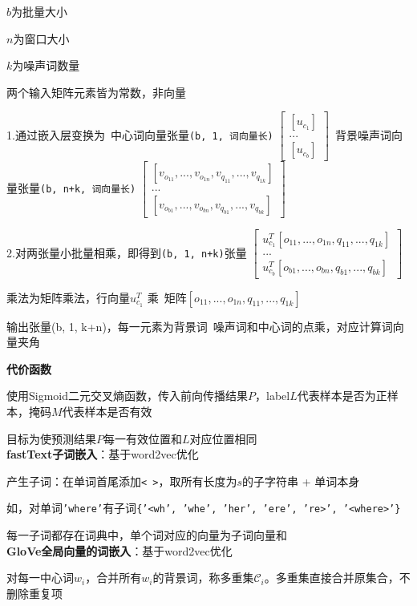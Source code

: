 \documentclass[UTF8]{ctexart}
\begin{document}
  \quad \quad $b$为批量大小

  \quad \quad $n$为窗口大小

  \quad \quad $k$为噪声词数量

  \quad \quad 两个输入矩阵元素皆为常数，非向量

  \quad 1.通过嵌入层变换为\ 中心词向量张量\texttt{(b, 1, 词向量长)}
  $\begin{bmatrix}
    [u_{c_1}] \\
    ... \\
    [u_{c_b}]
    \end{bmatrix}
  $\ 背景噪声词向量张量\texttt{(b, n+k, 词向量长)}
  $\begin{bmatrix}
    [v_{o_{11}}, ..., v_{o_{1n}}, v_{q_{11}}, ..., v_{q_{1k}}] \\
    ... \\
    [v_{o_{b1}}, ..., v_{o_{bn}}, v_{q_{b1}}, ..., v_{q_{bk}}]
    \end{bmatrix}
  $

  \quad 2.对两张量小批量相乘，即得到\texttt{(b, 1, n+k)}张量
  $\begin{bmatrix}
    u_{c_1}^T [o_{11}, ..., o_{1n}, q_{11}, ..., q_{1k}] \\
    ... \\
    u_{c_b}^T [o_{b1}, ..., o_{bn}, q_{b1}, ..., q_{bk}]
    \end{bmatrix}
  $

  \quad 乘法为矩阵乘法，行向量$u_{c_1}^T$ 乘\ 矩阵$[o_{11}, ..., o_{1n}, q_{11}, ..., q_{1k}]$
  
  \quad 输出张量(b, 1, k+n)，每一元素为背景词\ 噪声词和中心词的点乘，对应计算词向量夹角
  
  \textbf{代价函数}

  \quad 使用Sigmoid二元交叉熵函数，传入前向传播结果$P$，label$L$代表样本是否为正样本，掩码$M$代表样本是否有效

  \quad 目标为使预测结果$P$每一有效位置和$L$对应位置相同\\
\textbf{fastText子词嵌入}：基于word2vec优化

  产生子词：在单词首尾添加\texttt{< >}，取所有长度为$s$的子字符串 + 单词本身

  \quad 如，对单词\texttt{'where'}有子词\texttt{\{'<wh', 'whe', 'her', 'ere', 're>', '<where>'\}}

  每一子词都存在词典中，单个词对应的向量为子词向量和\\
\textbf{GloVe全局向量的词嵌入}：基于word2vec优化

  对每一中心词$w_i$，合并所有$w_i$的背景词，称多重集$\mathcal{C}_i$。多重集直接合并原集合，不删除重复项
\end{document}
